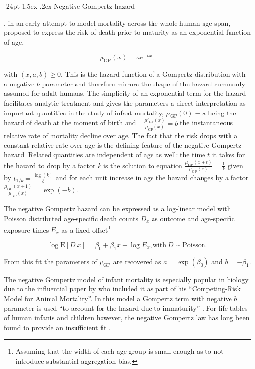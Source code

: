 \documentclass[10pt, twoside, parskip=half]{article}
\makeatletter
\renewcommand\subsection{\@startsection{subsection}{2}{\z@}%
                                     {-24pt}%
                                     {1.5ex \@plus .2ex}%
                                     {\normalfont\normalsize\bfseries}}
\makeatother
\begin{document}
\subsection{Negative Gompertz hazard}\label{negative-gompertz-hazard}

\citet{Thiele1871}, in an early attempt to model mortality across the
whole human age-span, proposed to express the risk of death prior to
maturity as an exponential function of age,

\[
\mu_\text{GP}(x) = ae^{-bx},
\]

with \((x,a,b)\geq 0\). This is the hazard function of a Gompertz
distribution with a negative \(b\) parameter and therefore mirrors the
shape of the hazard commonly assumed for adult humans. The simplicity of
an exponential term for the hazard facilitates analytic treatment and
gives the parameters a direct interpretation as important quantities in
the study of infant mortality, \(\mu_\text{GP}(0)=a\) being the hazard
of death at the moment of birth and
\(-\frac{\mu'_\text{GP}(x)}{\mu_\text{GP}(x)}=b\) the instantaneous
relative rate of mortality decline over age. The fact that the risk
drops with a constant relative rate over age is the defining feature of
the negative Gompertz hazard. Related quantities are independent of age
as well: the time \(t\) it takes for the hazard to drop by a factor
\(k\) is the solution to equation
\(\frac{\mu_\text{GP}(x+t)}{\mu_\text{GP}(x)} = \frac{1}{k}\) given by
\(t_{1/k}=\frac{\log(k)}{b}\) and for each unit increase in age the
hazard changes by a factor
\(\frac{\mu_\text{GP}(x+1)}{\mu_\text{GP}(x)}=\exp(-b)\).

The negative Gompertz hazard can be expressed as a log-linear model with
Poisson distributed age-specific death counts \(D_x\) as outcome and
age-specific exposure times \(E_x\) as a fixed offset\footnote{Assuming
  that the width of each age group is small enough as to not introduce
  substantial aggregation bias.}

\[
\log\text{E}[D|x] = \beta_0 + \beta_1x + \log E_x, \text{with}~D\sim\text{Poisson}.
\]

From this fit the parameters of \(\mu_\text{GP}\) are recovered as
\(a = \exp(\beta_0)\) and \(b = -\beta_1\).

The negative Gompertz model of infant mortality is especially popular in
biology due to the influential paper by \citet{Siler1979} who included
it as part of his ``Competing-Risk Model for Animal Mortality''. In this
model a Gompertz term with negative \(b\) parameter is used ``to account
for the hazard due to immaturity'' \citep{Siler1979}. For life-tables of
human infants and children however, the negative Gompertz law has long
been found to provide an insufficient fit
\citetext{\citealp[p.~326]{Thiele1871}; \citealp{Choe1981}; \citealp{Gage1986}}.
\end{document}
